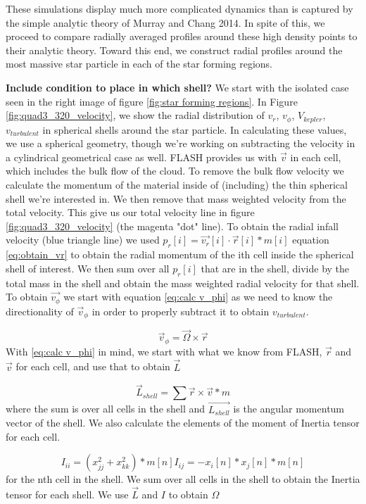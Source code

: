 \documentclass{emulateapj}
\newcommand{\be}{\begin{equation}}
\newcommand{\ee}{\end{equation}}
\begin{document}
These simulations display much more complicated dynamics than is captured by the simple analytic theory of Murray and Chang 2014.  In spite of this, we proceed to compare radially averaged profiles around these high density points to their analytic theory.  Toward this end, we construct radial profiles around the most massive star particle in each of the star forming regions.

{\bf Include condition to place in which shell?}
We start with the isolated case seen in the right image of figure \ref{fig:star forming regions}. In Figure \ref{fig:quad3_320_velocity}, we show the radial distribution of $v_r$, $v_\phi$, $V_{kepler}$, $v_{turbulent}$ in spherical shells around the star particle. In calculating these values, we use a spherical geometry, though we're working on subtracting the velocity in a  cylindrical geometrical case as well. 
FLASH provides us with $\vec{v}$ in each cell, which includes the bulk flow of the cloud. To remove the bulk flow velocity we calculate the momentum of the material inside of (including) the thin spherical shell we're interested in. We then remove that mass weighted velocity from the total velocity. This give us our total velocity line in figure \ref{fig:quad3_320_velocity} (the magenta "dot" line). 
To obtain the radial infall velocity (blue triangle line) we used $p_r[i] = \vec{v_r}[i] \cdot \vec{r}[i] * m[i]$ equation \ref{eq:obtain_vr} to obtain the radial momentum of the ith cell inside the spherical shell of interest. We then sum over all $p_{r}[i]$ that are in the shell, divide by the total mass in the shell and obtain the mass weighted radial velocity for that shell. 
To obtain $\vec{v_{\phi}}$ we start with equation \ref{eq:calc v_phi} as we need to know the directionality of $\vec{v}_{\phi}$ in order to properly subtract it to obtain $v_{turbulent}$.

\be
\vec{v}_{\phi} = \vec{\Omega} \times \vec{r}
\label{eq:calc v_phi}
\ee
With \ref{eq:calc v_phi} in mind, we start with what we know from FLASH, $\vec{r}$ and $\vec{v}$ for each cell, and use that to obtain $\vec{L}$

\be
\vec{L}_{shell} = \sum{\vec{r} \times \vec{v} * m}
\label{eq:calc L shell}
\ee
where the sum is over all cells in the shell and $\vec{L_{shell}}$ is the angular momentum vector of the shell. We also calculate the elements of the moment of Inertia tensor for each cell.

\be
I_{ii} = (x_{jj}^2 + x_{kk}^2) * m[n]
I_{ij} = -x_{i}[n]*x_{j}[n] * m[n]
\label{eq:moment of inertia}
\ee
for the nth cell in the shell. We sum over all cells in the shell to obtain the Inertia tensor for each shell.
We use $\vec{L}$ and $I$ to obtain $\Omega$
\end{document}
